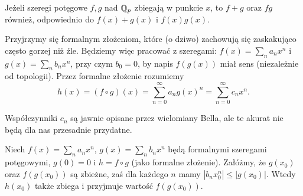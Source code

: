 \begin{fakt}\label{decoris}
	Jeżeli szeregi potęgowe $f, g$ nad $\mathbb Q_p$ zbiegają w punkcie $x$, to $f+g$ oraz $fg$ również, odpowiednio do $f(x) + g(x)$ i $f(x)g(x)$.
\end{fakt}

Przyjrzymy się formalnym złożeniom, które (o dziwo) zachowują się zaskakująco często gorzej niż źle.
Będziemy więc pracować z szeregami: $f(x) = \sum_n a_n x^n$ i $g(x) = \sum_n b_n x^n$, przy czym $b_0 = 0$, by napis $f(g(x))$ miał sens (niezależnie od topologii).
Przez formalne złożenie rozumiemy
\[
	h(x) = (f \circ g)(x) = \sum_{n = 0}^\infty a_n g(x)^n = \sum_{n = 0}^\infty c_n x^n.
\]

Współczynniki $c_n$ są jawnie opisane przez wielomiany Bella, ale te akurat nie będą dla nas przesadnie przydatne.

\begin{fakt}[złoty] \label{auctoris}
	Niech $f(x) = \sum_n a_n x^n$, $g(x) = \sum_n b_n x^n$ będą formalnymi szeregami potęgowymi, $g(0) = 0$ i $h = f \circ g$ (jako formalne złożenie).
	Załóżmy, że $g(x_0)$ oraz $f(g(x_0))$ są zbieżne, zaś dla każdego $n$ mamy $|b_n x_0^n| \le |g(x_0)|$.
	Wtedy $h(x_0)$ także zbiega i przyjmuje wartość $f(g(x_0))$.
\end{fakt}

